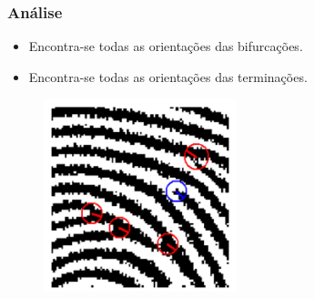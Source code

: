 \documentclass{beamer}
\begin{document}

\begin{frame}
\frametitle{Análise}
		
		\begin{itemize}
			\item Encontra-se todas as orientações das bifurcações.
			\item Encontra-se todas as orientações das terminações.
		\end{itemize}

	\begin{figure}[!h]
		\begin{center}
			\includegraphics[width=0.5\textwidth]{Figures/orientacoes}
		\end{center}
		
	\end{figure}
	
\end{frame}

\end{document}
